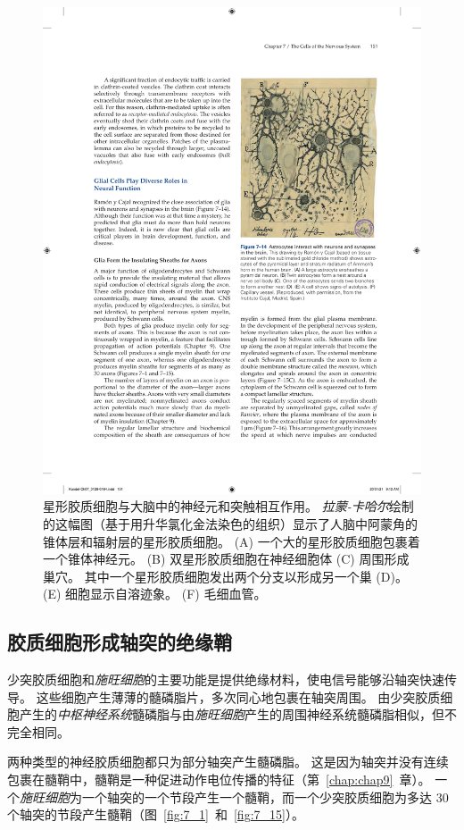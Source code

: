 \begin{figure}[htbp]
	\centering
	\includegraphics[width=0.5\linewidth]{chap07/fig_7_14}
	\caption{星形胶质细胞与大脑中的神经元和突触相互作用。
		\textit{拉蒙-卡哈尔}绘制的这幅图（基于用升华氯化金法染色的组织）显示了人脑中阿蒙角的锥体层和辐射层的星形胶质细胞。
		(A) 一个大的星形胶质细胞包裹着一个锥体神经元。
		(B) 双星形胶质细胞在神经细胞体 (C) 周围形成巢穴。
		其中一个星形胶质细胞发出两个分支以形成另一个巢 (D)。 
		(E) 细胞显示自溶迹象。 (F) 毛细血管。 }
	\label{fig:7_14}
\end{figure}



\subsection{胶质细胞形成轴突的绝缘鞘}

少突胶质细胞和\textit{施旺细胞}的主要功能是提供绝缘材料，使电信号能够沿轴突快速传导。
这些细胞产生薄薄的髓磷脂片，多次同心地包裹在轴突周围。
由少突胶质细胞产生的\textit{中枢神经系统}髓磷脂与由\textit{施旺细胞}产生的周围神经系统髓磷脂相似，但不完全相同。


两种类型的神经胶质细胞都只为部分轴突产生髓磷脂。
这是因为轴突并没有连续包裹在髓鞘中，髓鞘是一种促进动作电位传播的特征（第~\ref{chap:chap9}~章）。 
一个\textit{施旺细胞}为一个轴突的一个节段产生一个髓鞘，而一个少突胶质细胞为多达 30 个轴突的节段产生髓鞘（图~\ref{fig:7_1}~和~\ref{fig:7_15}）。


